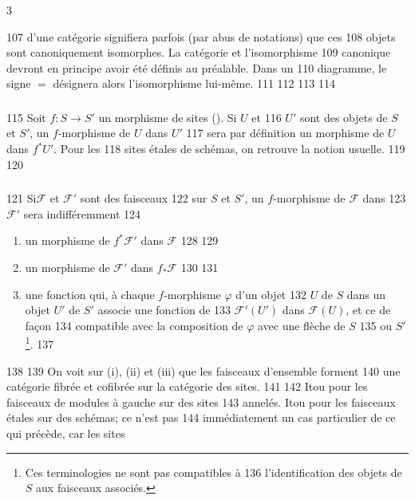 3	\documentclass[10pt]{../fichiers-configuration-latex/smfart}
\begin{document}
   107	d'une catégorie signifiera parfois (par abus de notations) que ces
   108	objets sont canoniquement isomorphes. La catégorie et l'isomorphisme
   109	canonique devront en principe avoir été définis au préalable. Dans un
   110	diagramme, le signe $=$ désignera alors l'isomorphisme lui-même.
   111	
   112	\setcounter{subsection}{2}
   113	\setcounter{subsubsection}{-1}
   114	\subsubsection{}
   115	Soit $f:S\rightarrow S'$ un morphisme de sites (). Si $U$ et
   116	$U'$ sont des objets de $S$ et $S'$, un $f$-morphisme de $U$ dans $U'$
   117	sera par définition un morphisme de $U$ dans $f^{\ast}U'$. Pour les
   118	sites étales de schémas, on retrouve la notion usuelle.
   119	
   120	\subsubsection{}
   121	Si\pageoriginale $\mathcal{F}$ et $\mathcal{F}'$ sont des faisceaux
   122	sur $S$ et $S'$, un $f$-morphisme de $\mathcal{F}$ dans
   123	$\mathcal{F}'$ sera indifféremment
   124	\begin{enumerate}
   125	\renewcommand{\theenumi}{\roman{enumi}}
   126	\renewcommand{\labelenumi}{(\theenumi)}
   127	\item un morphisme de $f^{\ast}\mathcal{F}'$ dans $\mathcal{F}$
   128	
   129	\item un morphisme de $\mathcal{F}'$ dans $f_{\ast}\mathcal{F}$
   130	
   131	\item une fonction qui, à chaque $f$-morphisme $\varphi$ d'un objet
   132	  $U$ de $S$ dans un objet $U'$ de $S'$ associe une fonction de
   133	  $\mathcal{F}'(U')$ dans $\mathcal{F}(U)$, et ce de façon
   134	  compatible avec la composition de $\varphi$ avec une flèche de $S$
   135	  ou $S'$ \footnote{Ces terminologies ne sont pas compatibles à
   136	  l'identification des objets de $S$ aux faisceaux associés.}.
   137	\end{enumerate}
   138	
   139	On voit sur (i), (ii) et (iii) que les faisceaux d'ensemble forment
   140	une catégorie fibrée et cofibrée sur la catégorie des sites.
   141	
   142	Itou pour les faisceaux de modules à gauche sur des sites
   143	annelés. Itou pour les faisceaux étales sur des schémas; ce n'est pas
   144	immédiatement un cas particulier de ce qui précède, car les sites
\end{document}
